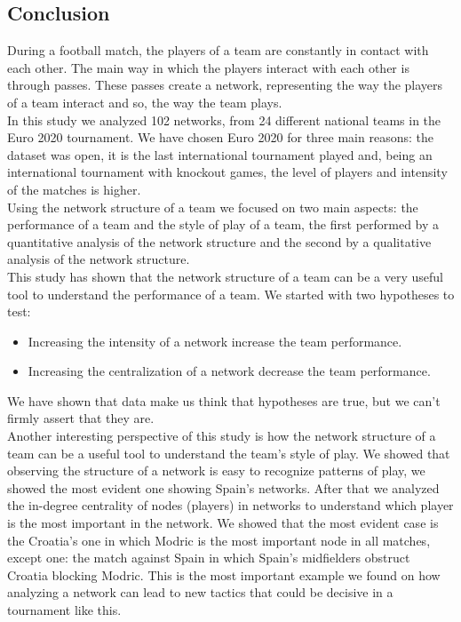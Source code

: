 \documentclass[12pt, a4paper]{article}
\begin{document}

\subsection{Conclusion}
\label{conclusion}
During a football match, the players of a team are constantly in contact with each other. The main way in which the players interact with each other is through passes. These passes create a network, representing the way the players of a team interact and so, the way the team plays.\\
In this study we analyzed 102 networks, from 24 different national teams in the Euro 2020 tournament. We have chosen Euro 2020 for three main reasons: the dataset was open, it is the last international tournament played and, being an international tournament with knockout games, the level of players and intensity of the matches is higher.\\
Using the network structure of a team we focused on two main aspects: the performance of a team and the style of play of a team, the first performed by a quantitative analysis of the network structure and the second by a qualitative analysis of the network structure.\\
This study has shown that the network structure of a team can be a very useful tool to understand the performance of a team. We started with two hypotheses to test:
\begin{itemize}
        \item Increasing the intensity of a network increase the team performance.
        \item Increasing the centralization of a network decrease the team performance. 
\end{itemize}
We have shown that data make us think that hypotheses are true, but we can't firmly assert that they are.\\
Another interesting perspective of this study is how the network structure of a team can be a useful tool to understand the team's style of play. We showed that observing the structure of a network is easy to recognize patterns of play, we showed the most evident one showing Spain's networks. After that we analyzed the in-degree centrality of nodes (players) in networks 
to understand which player is the most important in the network. We showed that the most evident case is the Croatia's one in which Modric is the most important node in all matches, except one: the match against Spain in which Spain's midfielders obstruct Croatia blocking Modric. This is the most important example we found on how analyzing a network can lead to new tactics that could be decisive in a tournament like this. \\
\end{document}
